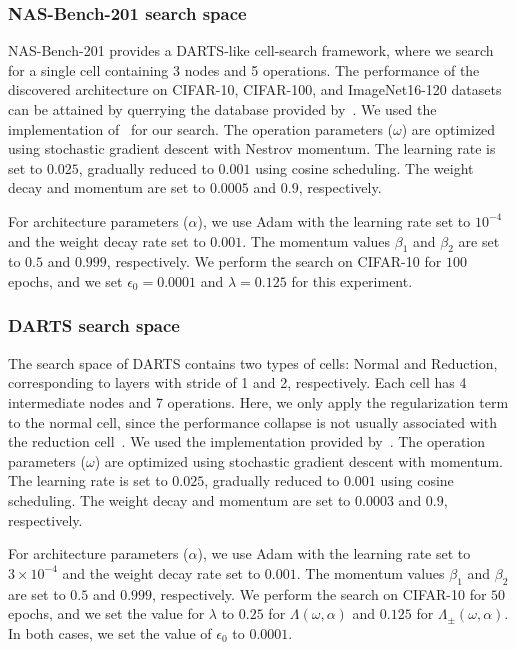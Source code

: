 \documentclass{article} \usepackage{fancyhdr, iclr2023_conference, times}
\begin{document}
\subsubsection{NAS-Bench-201 search space}
 NAS-Bench-201 provides a DARTS-like cell-search framework, where we search for a single cell containing 3 nodes and 5 operations. The performance of the discovered architecture on CIFAR-10, CIFAR-100, and ImageNet16-120 datasets can be attained by querrying the database provided by~\citep{DBLP:conf/iclr/Dong020}. We used the implementation of~\citep{DBLP:conf/iclr/Dong020} for our search. The operation parameters ($\omega$) are optimized using stochastic gradient descent with Nestrov momentum. The learning rate is set to $0.025$, gradually reduced to $0.001$ using cosine scheduling. The weight decay and momentum are set to $0.0005$ and $0.9$, respectively.  
 \par For architecture parameters ($\alpha$), we use Adam with the learning rate set to $10^{-4}$ and the weight decay rate set to $0.001$. The momentum values $\beta_1$ and $\beta_2$ are set to $0.5$ and $0.999$, respectively. We perform the search on CIFAR-10 for $100$ epochs, and we set $\epsilon_0=0.0001$ and $\lambda=0.125$ for this experiment. 
 \subsubsection{DARTS search space}
 The search space of DARTS contains two types of cells: Normal and Reduction, corresponding to layers with stride of 1 and 2, respectively. Each cell has 4 intermediate nodes and 7 operations. Here, we only apply the regularization term to the normal cell, since the performance collapse is not usually associated with the reduction cell~\citep{DBLP:conf/iclr/ZelaESMBH20}. We used the implementation provided by~\citep{DBLP:conf/iclr/WangCCTH21, DBLP:conf/icml/ChenH20}. The operation parameters ($\omega$) are optimized using stochastic gradient descent with momentum. The learning rate is set to $0.025$, gradually reduced to $0.001$ using cosine scheduling. The weight decay and momentum are set to $0.0003$ and $0.9$, respectively.  
 \par For architecture parameters ($\alpha$), we use Adam with the learning rate set to $3\times 10^{-4}$ and the weight decay rate set to $0.001$. The momentum values $\beta_1$ and $\beta_2$ are set to $0.5$ and $0.999$, respectively. We perform the search on CIFAR-10 for $50$ epochs, and we set the value for $\lambda$ to $0.25$ for $\Lambda(\omega, \alpha)$ and $0.125$ for $\Lambda_\pm(\omega, \alpha)$. In both cases, we set the value of $\epsilon_0$ to $0.0001$.
\end{document}

